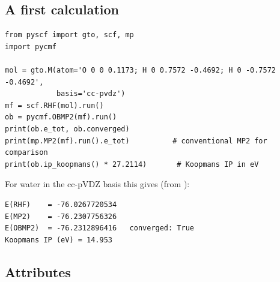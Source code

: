 \subsection{A first calculation}

\begin{lstlisting}[style=python]
from pyscf import gto, scf, mp
import pycmf

mol = gto.M(atom='O 0 0 0.1173; H 0 0.7572 -0.4692; H 0 -0.7572 -0.4692',
            basis='cc-pvdz')
mf = scf.RHF(mol).run()
ob = pycmf.OBMP2(mf).run()
print(ob.e_tot, ob.converged)
print(mp.MP2(mf).run().e_tot)          # conventional MP2 for comparison
print(ob.ip_koopmans() * 27.2114)       # Koopmans IP in eV
\end{lstlisting}

For water in the cc-pVDZ basis this gives (from
):

\begin{lstlisting}[style=output]
E(RHF)    = -76.0267720534
E(MP2)    = -76.2307756326
E(OBMP2)  = -76.2312896416   converged: True
Koopmans IP (eV) = 14.953
\end{lstlisting}

\subsection{Attributes}

